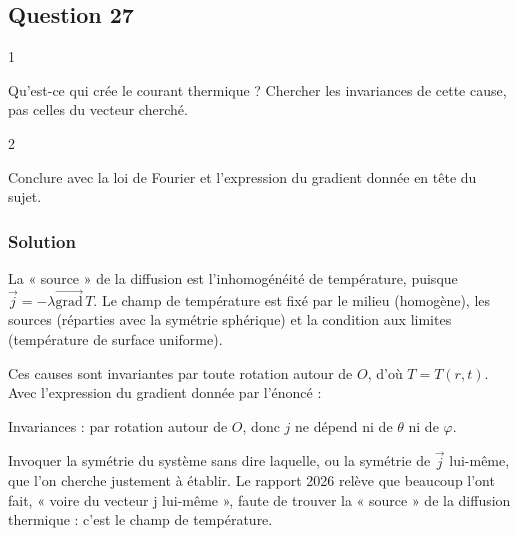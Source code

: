 \documentclass[11pt,a4paper]{article}
\newcommand{\equationajustee}[1]{%
  \sbox{\boiteequation}{$\displaystyle #1$}%
  \ifdim\wd\boiteequation>\linewidth
    \[\resizebox{\linewidth}{!}{\usebox{\boiteequation}}\]%
  \else
    \[#1\]%
  \fi}
\begin{document}
\hypertarget{question-27}{%
\subsection{Question 27}\label{question-27}}

\begin{indication}{1}

Qu'est-ce qui crée le courant thermique ? Chercher les invariances de cette cause, pas celles du vecteur cherché.

\end{indication}

\begin{indication}{2}

Conclure avec la loi de Fourier et l'expression du gradient donnée en tête du sujet.

\end{indication}

\hypertarget{solution-26}{%
\subsubsection{Solution}\label{solution-26}}

La « source » de la diffusion est l'inhomogénéité de température, puisque \(\vec j=-\lambda\overrightarrow{\mathrm{grad}}\,T\). Le champ de température est fixé par le milieu (homogène), les sources (réparties avec la symétrie sphérique) et la condition aux limites (température de surface uniforme).

Ces causes sont invariantes par toute rotation autour de \(O\), d'où \(T=T(r,t)\). Avec l'expression du gradient donnée par l'énoncé :

\equationajustee{\begin{aligned}
\vec j&=-\lambda\overrightarrow{\mathrm{grad}}\,T\\
&=-\lambda\frac{\partial T}{\partial r}\,\vec u_r
\end{aligned}}

\equationajustee{\boxed{\vec j=j(r,t)\,\vec u_r}}

Invariances : par rotation autour de \(O\), donc \(j\) ne dépend ni de \(\theta\) ni de \(\varphi\).

\begin{piege}

Invoquer la symétrie du système sans dire laquelle, ou la symétrie de \(\vec j\) lui-même, que l'on cherche justement à établir. Le rapport 2026 relève que beaucoup l'ont fait, « voire du vecteur j lui-même », faute de trouver la « source » de la diffusion thermique : c'est le champ de température.

\end{piege}
\end{document}
